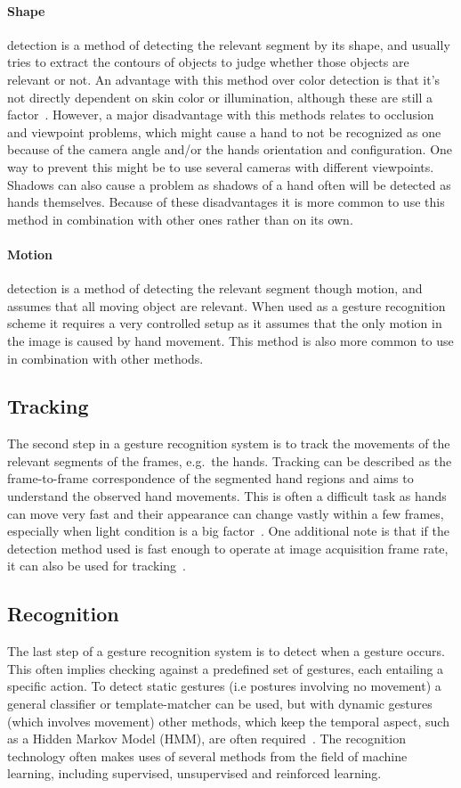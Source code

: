 \paragraph{Shape} detection is a method of detecting the relevant segment by its shape, and usually tries to extract the contours of objects to judge
whether those objects are relevant or not. An advantage with this method over color detection is that it's not directly dependent on skin color or
illumination, although these are still a factor~\citep{Rautaray2015}. However, a major disadvantage with this methods relates to occlusion and viewpoint
problems, which might cause a hand to not be recognized as one because of the camera angle and/or the hands orientation and configuration. One way to prevent this
might be to use several cameras with different viewpoints.
Shadows can also cause a problem as shadows of a hand often will be detected as hands themselves. Because of these disadvantages it is more
common to use this method in combination with other ones rather than on its own.

\paragraph{Motion} detection is a method of detecting the relevant segment though motion, and assumes that all moving object are relevant.
When used as a gesture recognition scheme it requires a very controlled setup as it assumes that the only motion in the image is caused by hand movement. 
This method is also more common to use in combination with other methods.


\subsection{Tracking}
The second step in a gesture recognition system is to track the movements of the relevant segments of the frames, e.g.~the hands. 
Tracking can be described as the frame-to-frame correspondence of the segmented hand regions and aims to understand the observed hand movements. 
This is often a difficult task as hands can move very fast and their appearance can change vastly within a few frames, 
especially when light condition is a big factor~\citep{Wang2010}. 
One additional note is that if the detection method used is fast enough to operate at image acquisition frame rate, it can also be used for tracking~\citep{Rautaray2015}.   

\subsection{Recognition}
The last step of a gesture recognition system is to detect when a gesture occurs. 
This often implies checking against a predefined set of gestures, each entailing a specific action. 
To detect static gestures (i.e postures involving no movement) a general classifier or template-matcher can be used, 
but with dynamic gestures (which involves movement) other methods, which keep the temporal aspect, such as a Hidden Markov Model (HMM), are often required~\citep{Benton1995}. 
The recognition technology often makes uses of several methods from the field of machine learning, including supervised, unsupervised and reinforced learning.

